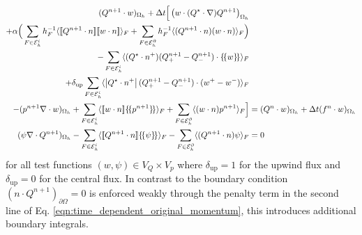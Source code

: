 \documentclass[11pt]{article}
\newcommand{\jump}[1]{[\![ #1]\!]}
\newcommand{\avg}[1]{\{\!\{#1\}\!\}}
\begin{document}
\begin{subequations}
    \begin{align}
        (Q^{n+1}\cdot w)_{\Omega_h} + \Delta t\Big[  \left(w\cdot (Q^\star\cdot \nabla) Q^{n+1}\right)_{\Omega_h}                                                                                            &
        \notag                                                                                                                                                                                                                                                                     \\ + \alpha \Big(\sum_{F\in\mathcal{E}_h^i} h_F^{-1}\langle \jump{Q^{n+1}\cdot n} \jump{w\cdot n}\rangle_F                                      +  \sum_{F\in\mathcal{E}_h^\partial} h_F^{-1}\langle (Q^{n+1}\cdot n) (w\cdot n)\rangle_F \Big)                                        &  \label{eqn:time_dependent_original_momentum}                                                            \\
        -\sum_{F\in\mathcal{E}_h^i} \langle (Q^\star \cdot n^+)(Q^{n+1}_+ - Q^{n+1}_-)\cdot \avg{w}\rangle_F\notag                                                                                           &                                                                     \\
        +\delta_{\text{up}}\sum_{F\in\mathcal{E}_h^i} \langle \left|Q^\star \cdot n^+\right|(Q^{n+1}_+ - Q^{n+1}_-)\cdot (w^+-w^-)\rangle_F
                                                                                                                                                                                                             & \notag                                                              \\
        - (p^{n+1} \nabla\cdot w)_{\Omega_h} +  \sum_{F\in\mathcal{E}_h^i} \langle \jump{w\cdot n}\avg{p^{n+1}}\rangle_{F}+  \sum_{F\in\mathcal{E}_h^\partial} \langle (w\cdot n)p^{n+1}\rangle_{F}    \Big] & = (Q^n\cdot w)_{\Omega_h} + \Delta t (f^n\cdot w)_{\Omega_h} \notag \\
        (\psi \nabla\cdot Q^{n+1})_{\Omega_h} - \sum_{F\in\mathcal{E}_h^i} \langle \jump{Q^{n+1}\cdot n}\avg{\psi}\rangle_{F} - \sum_{F\in\mathcal{E}_h^\partial} \langle (Q^{n+1}\cdot n)\psi\rangle_{F}    & = 0\label{eqn:time_dependent_original_continuity}
    \end{align}
\end{subequations}
for all test functions $(w,\psi) \in V_Q\times V_p$ where $\delta_{\text{up}}=1$ for the upwind flux and $\delta_{\text{up}}=0$ for the central flux. In contrast to \cite{Guzman2016} the boundary condition $(n\cdot Q^{n+1})_{\partial \Omega}=0$ is enforced weakly through the penalty term in the second line of Eq. \eqref{eqn:time_dependent_original_momentum}, this introduces additional boundary integrals.
\end{document}
